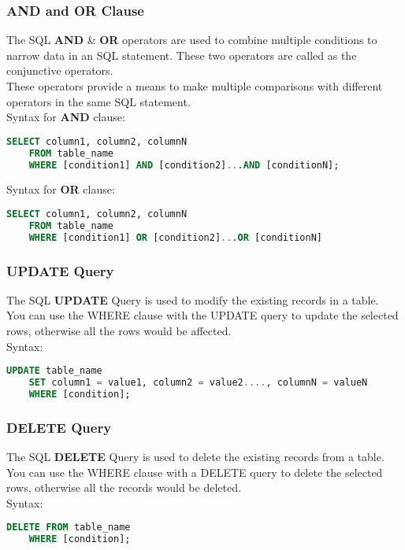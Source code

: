  \subsubsection*{{AND and OR Clause}}
 The SQL \textbf{AND} \& \textbf{OR} operators are used to combine multiple conditions to narrow data in an SQL statement. These two operators are called as the conjunctive operators.\\
 These operators provide a means to make multiple comparisons with different operators in the same SQL statement.\\
 Syntax for \textbf{AND} clause: 
 \begin{lstlisting}[language=SQL]
    SELECT column1, column2, columnN 
    FROM table_name
    WHERE [condition1] AND [condition2]...AND [conditionN];
 \end{lstlisting}
 Syntax for \textbf{OR} clause:
 \begin{lstlisting}[language=SQL]
    SELECT column1, column2, columnN 
    FROM table_name
    WHERE [condition1] OR [condition2]...OR [conditionN]
 \end{lstlisting}
 
 \subsubsection*{{UPDATE Query}}
 The SQL \textbf{UPDATE} Query is used to modify the existing records in a table.\\
 You can use the WHERE clause with the UPDATE query to update the selected rows, otherwise all the rows would be affected.\\
 Syntax: 
 \begin{lstlisting}[language=SQL]
    UPDATE table_name
    SET column1 = value1, column2 = value2...., columnN = valueN
    WHERE [condition];
 \end{lstlisting}
 
 \subsubsection*{{DELETE Query}}
 The SQL \textbf{DELETE} Query is used to delete the existing records from a table.\\
 You can use the WHERE clause with a DELETE query to delete the selected rows, otherwise all the records would be deleted.\\
 Syntax: 
 \begin{lstlisting}[language=SQL]
    DELETE FROM table_name
    WHERE [condition];
 \end{lstlisting}
 
